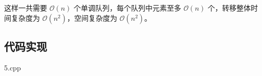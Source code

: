 这样一共需要 \(\mathcal{O}(n)\) 个单调队列，每个队列中元素至多
\(\mathcal{O}(n)\) 个，转移整体时间复杂度为
\(\mathcal{O}(n^2)\)，空间复杂度为 \(\mathcal{O}(n^2)\)。

\subsection{代码实现}

5.cpp













